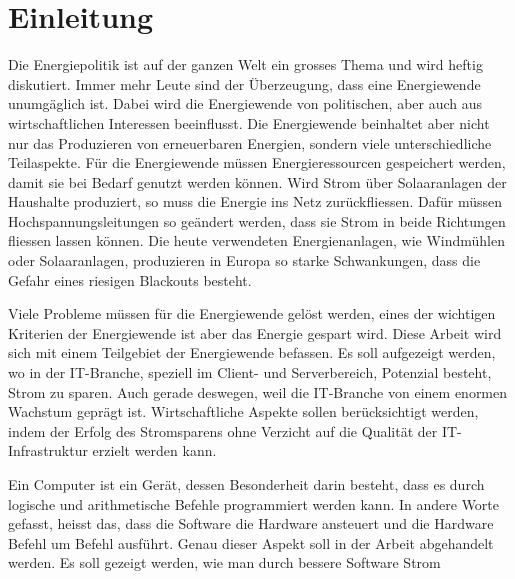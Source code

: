 \chapter{Einleitung}

Die Energiepolitik ist auf der ganzen Welt ein grosses Thema und wird heftig diskutiert. Immer mehr Leute
sind der Überzeugung, dass eine Energiewende unumgäglich ist. Dabei wird die Energiewende von politischen, aber auch
aus wirtschaftlichen Interessen beeinflusst. Die Energiewende beinhaltet aber nicht nur
das Produzieren von erneuerbaren Energien, sondern viele unterschiedliche Teilaspekte. Für die Energiewende
müssen Energieressourcen gespeichert werden, damit sie bei Bedarf genutzt werden können. Wird Strom über
Solaaranlagen der Haushalte produziert, so muss die Energie ins Netz zurückfliessen. Dafür müssen
Hochspannungsleitungen so geändert werden, dass sie Strom in beide Richtungen fliessen lassen können.
Die heute verwendeten Energienanlagen, wie Windmühlen oder Solaaranlagen, produzieren in Europa so starke
Schwankungen, dass die Gefahr eines riesigen Blackouts besteht.
\par
Viele Probleme müssen für die Energiewende gelöst werden, eines der wichtigen Kriterien der Energiewende ist aber
das Energie gespart wird. Diese Arbeit wird sich mit einem Teilgebiet der Energiewende befassen.
Es soll aufgezeigt werden, wo in der IT-Branche, speziell im Client- und Serverbereich, Potenzial besteht,
Strom zu sparen. Auch gerade deswegen, weil die IT-Branche von einem enormen Wachstum geprägt ist. Wirtschaftliche Aspekte sollen
berücksichtigt werden, indem der Erfolg des Stromsparens ohne Verzicht auf die Qualität der IT-Infrastruktur erzielt
werden kann. 
\par
Ein Computer ist ein Gerät, dessen Besonderheit darin besteht, dass es durch logische und arithmetische Befehle programmiert
werden kann. In andere Worte gefasst, heisst das, dass die Software die Hardware ansteuert und die Hardware Befehl um Befehl ausführt.
Genau dieser Aspekt soll in der Arbeit abgehandelt werden. Es soll gezeigt werden, wie man durch bessere Software Strom
